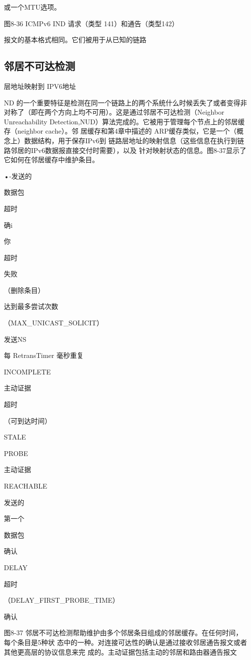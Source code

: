 或一个MTU选项。

图8-36 ICMPv6 IND 请求（类型 141）和通告（类型142）

报文的基本格式相同。它们被用于从已知的链路

\subsection{邻居不可达检测}
层地址映射到 IPV6地址

ND 的一个重要特征是检测在同一个链路上的两个系统什么时候丢失了或者变得非
对称了（即在两个方向上均不可用）。这是通过邻居不可达检测（Neighbor Unreachability
Detection,NUD）算法完成的。它被用于管理每个节点上的邻居缓存（neighbor cache）。邻
居缓存和第4章中描述的 ARP缓存类似，它是一个（概念上）数据结构，用于保存IPv6到
链路层地址的映射信息（这些信息在执行到链路邻居的IPv6数据报直接交付时需要），以及
针对映射状态的信息。图8-37显示了它如何在邻居缓存中维护条目。

•-发送的

数据包

超时

确i

你

超时

失败

（删除条目）

达到最多尝试次数

（MAX\_UNICAST\_SOLICIT）

发送NS

每 RetransTimer 毫秒重复

INCOMPLETE

主动证据

超时

（可到达时间）

STALE

PROBE

主动证据

REACHABLE

发送的

第一个

数据包

确认

DELAY

超时

（DELAY\_FIRST\_PROBE\_TIME）

确认

图8-37 邻居不可达检测帮助维护由多个邻居条目组成的邻居缓存。在任何时间，每个条目是5种状
态中的一种。对连接可达性的确认是通过接收邻居通告报文或者其他更高层的协议信息来完
成的。主动证据包括主动的邻居和路由器通告报文

